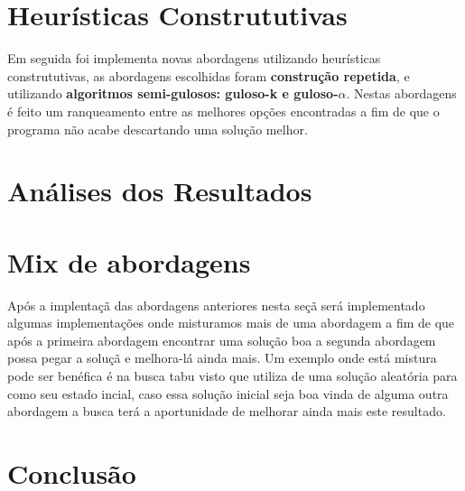 \documentclass[a4paper,11pt]{article}
\begin{document}
\section{ Heur\'isticas Constrututivas}

Em seguida foi implementa novas abordagens utilizando heur\'isticas constrututivas, as abordagens escolhidas foram \textbf{constru\c c\~ao repetida}, e utilizando \textbf{algoritmos semi-gulosos: guloso-k e guloso-$\alpha$}. Nestas abordagens \'e feito um ranqueamento entre as melhores op\c c\~oes encontradas a fim de que o programa n\~ao acabe descartando uma solu\c c\~ao melhor. 

\section{ An\'alises dos Resultados }

\section{ Mix de abordagens }
Ap\'os a implenta\c c\~a das abordagens anteriores nesta se\c c\~a ser\'a implementado algumas implementa\c c\~oes onde misturamos mais de uma abordagem a fim de que ap\'os a primeira abordagem encontrar uma solu\c c\~ao boa a segunda abordagem possa pegar a solu\c c\~a e melhora-l\'a ainda mais. Um exemplo onde est\'a mistura pode ser ben\'efica \'e na busca tabu visto que utiliza de uma solu\c c\~ao aleat\'oria para como seu estado incial, caso essa solu\c c\~ao inicial seja boa vinda de alguma outra abordagem a busca ter\'a a aportunidade de melhorar ainda mais este resultado.

\section{ Conclus\~ao }

~\\


\end{document}
